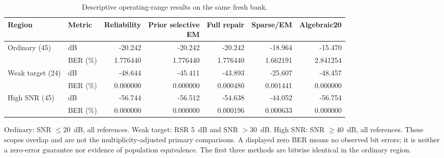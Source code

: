 \begin{table}[!t]
\centering
\caption{Descriptive operating-range results on the same fresh bank.}
\label{tab:reliability-regions}
\small
\setlength{\tabcolsep}{4pt}
\begin{tabular}{llrrrrr}
\toprule
Region & Metric & Reliability & \shortstack{Prior selective\\EM} & Full repair & Sparse/EM & Algebraic20 \\
\midrule
Ordinary (45) & dB & -20.242 & -20.242 & -20.242 & -18.964 & -15.470 \\
 & BER (\%) & 1.776440 & 1.776440 & 1.776440 & 1.662191 & 2.841254 \\
Weak target (24) & dB & -48.644 & -45.411 & -43.893 & -25.607 & -48.457 \\
 & BER (\%) & 0.000000 & 0.000000 & 0.000480 & 0.001441 & 0.000000 \\
High SNR (45) & dB & -56.744 & -56.512 & -54.638 & -44.052 & -56.754 \\
 & BER (\%) & 0.000000 & 0.000000 & 0.000196 & 0.000633 & 0.000000 \\
\bottomrule
\end{tabular}
\par\vspace{2pt}
\begin{minipage}{0.98\textwidth}\footnotesize Ordinary: SNR $\leq20$~dB, all references. Weak target: RSR 5~dB and SNR $>30$~dB. High SNR: SNR $\geq40$~dB, all references. These scopes overlap and are not the multiplicity-adjusted primary comparisons. A displayed zero BER means no observed bit errors; it is neither a zero-error guarantee nor evidence of population equivalence. The first three methods are bitwise identical in the ordinary region.\end{minipage}
\end{table}

